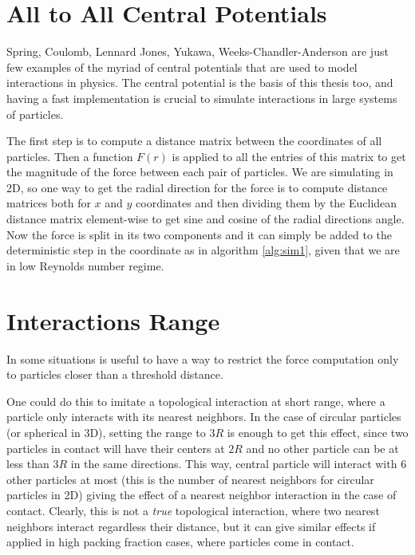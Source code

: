 \documentclass[../../master_thesis_np.tex]{subfiles}
\begin{document}
	\section{All to All Central Potentials}
	Spring, Coulomb, Lennard Jones, Yukawa, Weeks-Chandler-Anderson are just few examples of the myriad of central potentials that are used to model interactions in physics. The central potential is the basis of this thesis too, and having a fast implementation is crucial to simulate interactions in large systems of particles. 
	
	The first step is to compute a distance matrix between the coordinates of all particles. Then a function $F(r)$ is applied to all the entries of this matrix to get the magnitude of the force between each pair of particles. We are simulating in 2D, so one way to get the radial direction for the force is to compute distance matrices both for $x$ and $y$ coordinates and then dividing them by the Euclidean distance matrix element-wise to get sine and cosine of the radial directions angle. Now the force is split in its two components and it can simply be added to the deterministic step in the coordinate as in algorithm \ref{alg:sim1}, given that we are in low Reynolds number regime. 
	
	\section{Interactions Range}
	In some situations is useful to have a way to restrict the force computation only to particles closer than a threshold distance.
	
	One could do this to imitate a topological interaction at short range, where a particle only interacts with its nearest neighbors. In the case of circular particles (or spherical in 3D), setting the range to $3R$ is enough to get this effect, since two particles in contact will have their centers at $2R$ and no other particle can be at less than $3R$ in the same directions. This way, central particle will interact with 6 other particles at most (this is the number of nearest neighbors for circular particles in 2D) giving the effect of a nearest neighbor interaction in the case of contact. Clearly, this is not a \emph{true} topological interaction, where two nearest neighbors interact regardless their distance, but it can give similar effects if applied in high packing fraction cases, where particles come in contact.
	
\end{document}
